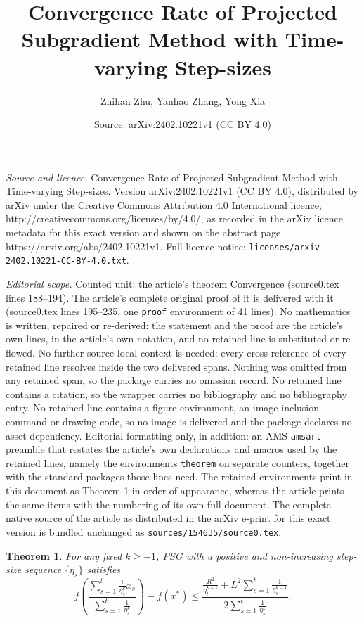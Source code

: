 \documentclass[10pt,a4paper]{amsart}
\title{Convergence Rate of Projected Subgradient Method with Time-varying Step-sizes}
\author{Zhihan Zhu, Yanhao Zhang, Yong Xia}
\date{Source: arXiv:2402.10221v1 (CC BY 4.0)}
\newtheorem{theorem}{Theorem}
\begin{document}
\maketitle

\noindent\emph{Source and licence.} Convergence Rate of Projected Subgradient Method with Time-varying Step-sizes. Version arXiv:2402.10221v1 (CC BY 4.0), distributed by arXiv under the Creative Commons Attribution 4.0 International licence, http://creativecommons.org/licenses/by/4.0/, as recorded in the arXiv licence metadata for this exact version and shown on the abstract page https://arxiv.org/abs/2402.10221v1. Full licence notice: \texttt{licenses/arxiv-2402.10221-CC-BY-4.0.txt}.\par\smallskip

\noindent\textit{Editorial scope.} Counted unit: the article's theorem Convergence (source0.tex lines 188--194). The article's complete original proof of it is delivered with it (source0.tex lines 195--235, one \texttt{proof} environment of 41 lines). No mathematics is written, repaired or re-derived: the statement and the proof are the article's own lines, in the article's own notation, and no retained line is substituted or re-flowed.  No further source-local context is needed: every cross-reference of every retained line resolves inside the two delivered spans.  Nothing was omitted from any retained span, so the package carries no omission record.  No retained line contains a citation, so the wrapper carries no bibliography and no bibliography entry.  No retained line contains a figure environment, an image-inclusion command or drawing code, so no image is delivered and the package declares no asset dependency.  Editorial formatting only, in addition: an AMS \texttt{amsart} preamble that restates the article's own declarations and macros used by the retained lines, namely the environments \texttt{theorem} on separate counters, together with the standard packages those lines need.  The retained environments print in this document as Theorem 1 in order of appearance, whereas the article prints the same items with the numbering of its own full document.  The complete native source of the article as distributed in the arXiv e-print for this exact version is bundled unchanged as \texttt{sources/154635/source0.tex}.
\begin{theorem}\label{Convergence}
For any fixed $k\ge -1$,
PSG with a positive and non-increasing step-size sequence $\{\eta_s\}$ satisfies
	\begin{equation}
		f\left(\frac{\sum_{s=1}^t \frac{1}{\eta_s^k}x_s}{\sum_{s=1}^t \frac{1}{\eta_s^k}}\right)-f(x^*)\le \frac{\frac{R^2}{\eta_t^{k+1}}+ L^2 \sum_{s=1}^t\frac{1}{\eta_s^{k-1}}}{2\sum_{s=1}^t\frac{1}{\eta_s^k}}. \label{bound}
	\end{equation}
\end{theorem}	
\end{document}
